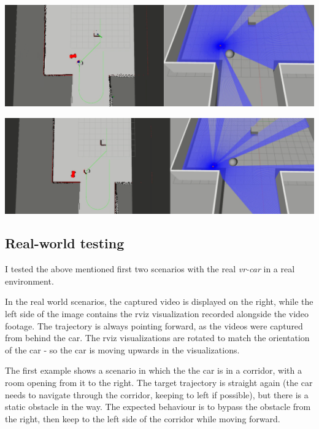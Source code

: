 \begin{center}
    \vspace{0.5cm}
    \includegraphics[width=\textwidth]{figures/raw/local_planner_test_curved_traj_2_static_objects_5.png}

    \vspace{0.5cm}
    \includegraphics[width=\textwidth]{figures/raw/local_planner_test_curved_traj_2_static_objects_6.png}

    \label{local_planner_test_curved_traj_2_static_objects}
\end{center}

\subsection{Real-world testing}
\label{chap:real_world_testing}
I tested the above mentioned first two scenarios with the real \textit{vr-car} in a real environment.

In the real world scenarios, the captured video is displayed on the right, while the left side of the image contains the rviz visualization recorded alongside the video footage. The trajectory is always pointing forward, as the videos were captured from behind the car. The rviz visualizations are rotated to match the orientation of the car - so the car is moving upwards in the visualizations.

The first example shows a scenario in which the the car is in a corridor, with a room opening from it to the right. The target trajectory is straight again (the car needs to navigate through the corridor, keeping to left if possible), but there is a static obstacle in the way. The expected behaviour is to bypass the obstacle from the right, then keep to the left side of the corridor while moving forward.

